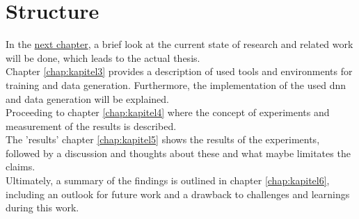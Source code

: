 	
	
	\section{Structure}
	\label{sec:structure}
		In the \hyperref[chap:kapitel2]{next chapter}, a brief look at the current state of research and related work will be done, which leads to the actual thesis.\\
		Chapter \ref{chap:kapitel3} provides a description of used tools and environments for training and data generation. Furthermore, the implementation of the used \ac{dnn} and data generation will be explained.\\
		Proceeding to chapter \ref{chap:kapitel4} where the concept of experiments and measurement of the results is described.\\
		The 'results' chapter \ref{chap:kapitel5} shows the results of the experiments, followed by a discussion and thoughts about these and what maybe limitates the claims.\\
		Ultimately, a summary of the findings is outlined in chapter \ref{chap:kapitel6}, including an outlook for future work and a drawback to challenges and learnings during this work.
		





